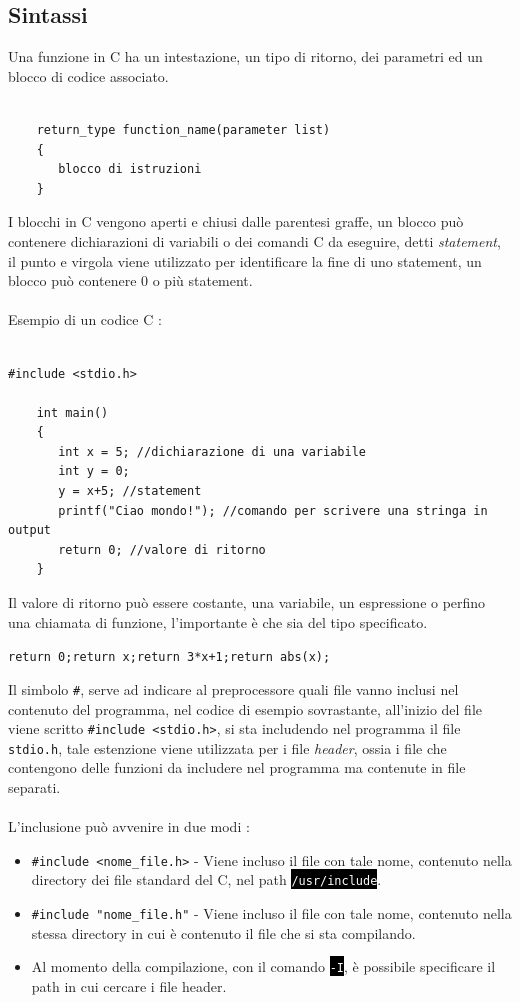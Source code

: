 \documentclass[12pt, letterpaper]{article}
\newcommand{\code}[1]{\colorbox{light-gray}{\texttt{#1}}}
\newcommand{\shelll}[1]{\colorbox{black}{\textcolor{white}{\texttt{#1}}}}
\newcommand{\acc}{\\\hphantom{}\\}
\begin{document}
\subsection{Sintassi}
Una funzione in C ha un intestazione, un tipo di ritorno, dei parametri ed un blocco di codice associato.
\begin{lstlisting}[style=CStyle]
    
    return_type function_name(parameter list)
    {
       blocco di istruzioni
    }
    \end{lstlisting}
I blocchi in C vengono aperti e chiusi dalle parentesi graffe, un blocco può contenere 
dichiarazioni di variabili o dei comandi C da eseguire, detti \textit{statement}, il punto e virgola viene 
utilizzato per identificare la fine di uno statement, un blocco può contenere 0 o più statement.\acc 
Esempio di un codice C :
\begin{lstlisting}[style=CStyle]

#include <stdio.h>

    int main()
    {
       int x = 5; //dichiarazione di una variabile 
       int y = 0;
       y = x+5; //statement 
       printf("Ciao mondo!"); //comando per scrivere una stringa in output 
       return 0; //valore di ritorno
    }
    \end{lstlisting}
Il valore di ritorno può essere costante, una variabile, un espressione o perfino una chiamata di funzione, l'importante 
è che sia del tipo specificato.\begin{center}
    \code{return 0;}\hphantom{text}\code{return x;}\hphantom{text}\code{return 3*x+1;}\hphantom{text}\code{return abs(x);}
\end{center}
Il simbolo \code{\#}, serve ad indicare al preprocessore quali file vanno inclusi nel contenuto del programma, nel codice 
di esempio sovrastante, all'inizio del file viene scritto \code{\#include <stdio.h>}, si sta includendo nel programma il 
file \code{stdio.h}, tale estenzione viene utilizzata per i file \textit{header}, ossia i file che contengono delle funzioni da 
includere nel programma ma contenute in file separati.\acc L'inclusione può avvenire in due modi :
\begin{itemize}
    \item \code{\#include <nome\_file.h>} - Viene incluso il file con tale nome, contenuto nella directory dei file standard 
    del C, nel path \shelll{/usr/include}.
    \item \code{\#include "nome\_file.h"} - Viene incluso il file con tale nome, contenuto nella stessa directory in cui 
    è contenuto il file che si sta compilando.
    \item Al momento della compilazione, con il comando \shelll{-I}, è possibile specificare il path in cui cercare i file header.
\end{itemize}
\end{document}
